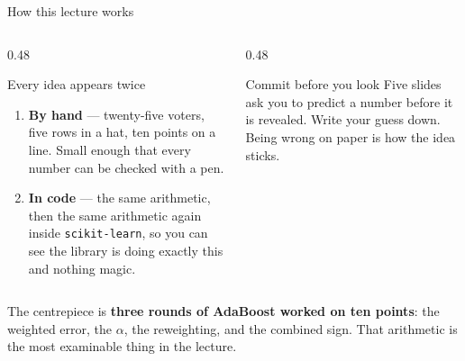 \documentclass[aspectratio=169]{beamer}
\begin{document}
\begin{frame}[shrink=7]{How this lecture works}
  \begin{columns}[T]
    \begin{column}{0.48\textwidth}
      \begin{block}{Every idea appears twice}
        \begin{enumerate}
          \item \textbf{By hand} --- twenty-five voters, five rows in a hat,
            ten points on a line. Small enough that every number can be
            checked with a pen.
          \item \textbf{In code} --- the same arithmetic, then the same
            arithmetic again inside \texttt{scikit-learn}, so you can see
            the library is doing exactly this and nothing magic.
        \end{enumerate}
      \end{block}
    \end{column}
    \begin{column}{0.48\textwidth}
      \begin{alertblock}{Commit before you look}
        Five slides ask you to predict a number before it is revealed. Write
        your guess down. Being wrong on paper is how the idea sticks.
      \end{alertblock}
    \end{column}
  \end{columns}
  \vspace{0.4em}
  \begin{center}
    \small The centrepiece is \textbf{three rounds of AdaBoost worked on ten
    points}: the weighted error, the $\alpha$, the reweighting, and the
    combined sign. That arithmetic is the most examinable thing in the
    lecture.
  \end{center}
\end{frame}
\end{document}

